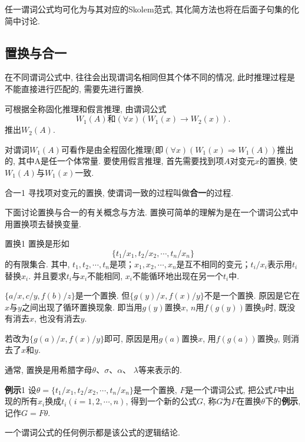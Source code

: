 任一谓词公式均可化为与其对应的Skolem范式, 其化简方法也将在后面子句集的化简中讨论.
\subsection{置换与合一}
在不同谓词公式中, 往往会出现谓词名相同但其个体不同的情况, 此时推理过程是不能直接进行匹配的, 需要先进行置换.

\begin{example}
可根据全称固化推理和假言推理, 由谓词公式
        $$W_1(A) 和 (\forall x)(W_1(x)\rightarrow W_2(x)).$$
推出$W_2(A)$.
\end{example}

\begin{remark}
 对谓词$W_1(A)$可看作是由全程固化推理(即$(\forall x)(W_1(x) \Rightarrow  W_1(A))$推出的, 其中A是任一个体常量. 要使用假言推理, 首先需要找到项$A$对变元$x$的置换, 使$W_1(A)$与$W_1(x)$一致.
\end{remark}

\begin{mydef}{合一}{1}
寻找项对变元的置换, 使谓词一致的过程叫做\textcolor[rgb]{0,0,1}{\textbf{合一}}的过程.
\end{mydef}

下面讨论置换与合一的有关概念与方法. 置换可简单的理解为是在一个谓词公式中用置换项去替换变量.
\begin{mydef}{置换}{1}
置换是形如
            $$\{t_1/x_1,t_2/x_2,\cdots,t_n/x_n\}$$
的有限集合. 其中, $t_1,t_2,\cdots,t_n$是项；$x_1,x_2,\cdots,x_n$是互不相同的变元；$t_i/x_i$表示用$t_i$替换$x_i$. 并且要求$t_i$与$x_i$不能相同, $x_i$不能循环地出现在另一个$t_i$中.
\end{mydef}

\begin{example}
  $\{a/x, c/y, f(b)/z\}$是一个置换. 但$\{g(y)/x, f(x)/y\}$不是一个置换. 原因是它在$x$与$y$之间出现了循环置换现象. 即当用$g(y)$置换$x$, $n$用$f(g(y))$置换$y$时, 既没有消去$x$, 也没有消去$y$.
\begin{remark}
  若改为$\{g(a)/x, f(x)/y\}$即可, 原因是用$g(a)$置换$x$, 用$f(g(a))$置换$y$, 则消去了$x$和$y$.
\end{remark}
\end{example}

\begin{remark}
  通常, 置换是用希腊字母$\theta$、$\sigma$、$\alpha$、 $\lambda$等来表示的.
\end{remark}
\begin{mydef}{\textbf{例示}}{1}
设$\theta =\{t_1/x_1,t_2/x_2,\cdots,t_n/x_n\}$是一个置换, $F$是一个谓词公式, 把公式$F$中出现的所有$x_i$换成$t_i(i=1,2,\cdots,n)$, 得到一个新的公式$G$, 称$G$为$F$在置换$\theta $下的\textbf{例示}, 记作$G=F\theta $.
\end{mydef}
\begin{remark}
一个谓词公式的任何例示都是该公式的逻辑结论.
\end{remark}

